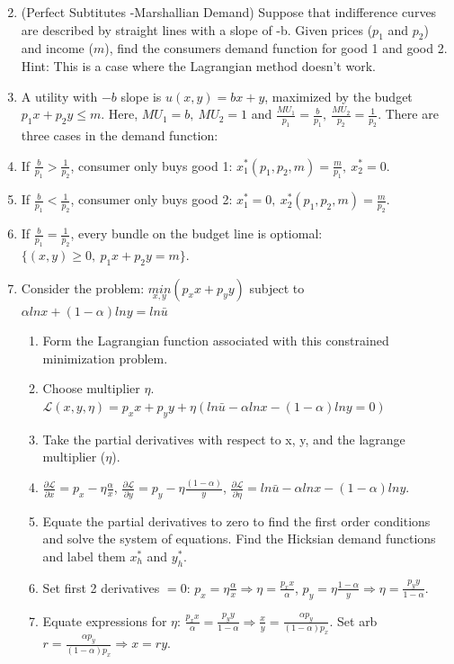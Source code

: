 \documentclass{article}
\begin{document}
\begin{enumerate}

 \setcounter{enumi}{1}
\item (Perfect Subtitutes -Marshallian Demand) Suppose that indifference curves are described by straight lines with a slope of -b. Given prices ($p_1$ and $p_2$) and income ($m$), find the consumers demand function for good 1 and good 2. Hint: This is a case where the Lagrangian method doesn't work.
\item[] A utility with $-b$ slope is $u(x,y)=bx+y$, maximized by the budget $p_1x+p_2y\leq m$. Here, $MU_1=b,\ MU_2=1$ and $\frac{MU_1}{p_1}=\frac{b}{p_1},\ \frac{MU_2}{p_2}=\frac{1}{p_2}$. There are three cases in the demand function:
\item[] If $\frac{b}{p_1}>\frac{1}{p_2}$, consumer only buys good 1: $x^*_1(p_1,p_2,m)=\frac{m}{p_1},\ x^*_2=0$.
\item[] If $\frac{b}{p_1}<\frac{1}{p_2}$, consumer only buys good 2: $x^*_1=0,\ x^*_2(p_1,p_2,m)=\frac{m}{p_2}$.
\item[] If $\frac{b}{p_1}=\frac{1}{p_2}$, every bundle on the budget line is optiomal: $\{(x,y)\geq0,\ p_1x+p_2y= m\}$.
\item Consider the problem:
$\underset{x, y}{min} (p_x x+p_y y)$ subject to $\alpha lnx+ (1-\alpha) lny=ln\bar{u}$
\begin{enumerate}[label=(\alph*)]
\item Form the Lagrangian function associated with this constrained minimization problem.
\item[] Choose multiplier $\eta$. $\mathcal{L}(x,y,\eta)=p_xx+p_yy+\eta(ln\bar u-\alpha lnx-(1-\alpha)lny=0)$
\item Take the partial derivatives with respect to x, y, and the lagrange multiplier ($\eta$).
\item[] $\frac{\partial \mathcal{L}}{\partial x}=p_x-\eta\frac{\alpha}{x}$, $\frac{\partial \mathcal{L}}{\partial y}=p_y-\eta\frac{(1-\alpha)}{y}$, $\frac{\partial \mathcal{L}}{\partial \eta}=ln\bar u-\alpha lnx-(1-\alpha)lny$.
\item Equate the partial derivatives to zero to find the first order conditions and solve the system of equations. Find the Hicksian demand functions and label them $x_h^*$ and $y_h^*$.
\item[] Set first 2 derivatives $=0$: $p_x=\eta\frac{\alpha}{x}\Rightarrow \eta=\frac{p_xx}{\alpha}$, $p_y=\eta\frac{1-\alpha}{y}\Rightarrow \eta=\frac{p_yy}{1-\alpha}$.
\item[] Equate expressions for $\eta$: $\frac{p_xx}{\alpha}=\frac{p_yy}{1-\alpha} \Rightarrow \frac{x}{y}=\frac{\alpha p_y}{(1-\alpha)p_x}$. Set arb $r=\frac{\alpha p_y}{(1-\alpha)p_x}\Rightarrow x=ry$.

\end{enumerate}
\end{enumerate}
\end{document}
